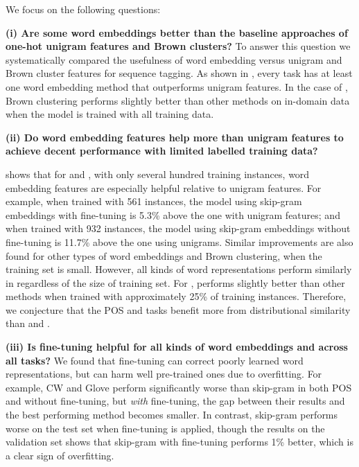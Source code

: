 We focus on the following questions:

\textbf{(i) Are some word embeddings better than the baseline approaches of one-hot unigram features and Brown clusters?}
To answer this question we systematically compared the usefulness of word embedding versus
unigram and Brown cluster features for sequence tagging.
As shown in , every task has at least one word embedding method that outperforms
unigram features. In the case of \chunking, Brown clustering performs slightly better than other methods on in-domain data when the model is trained with all training data. 


\textbf{(ii) Do word embedding features help more than unigram features to achieve decent performance with limited labelled training data?}

 shows that for \pos and \ner, with only several hundred training instances, 
word embedding features are especially helpful relative to unigram features. 
For example, when trained with 561 instances, the \pos model using skip-gram embeddings with fine-tuning is 5.3\% above
the one with unigram features; and when trained with 932 instances, the \ner model using skip-gram embeddings without fine-tuning is 11.7\% above the one using unigrams. 
Similar improvements are also found for other types of word embeddings and Brown clustering, when the training set is small. 
However, all kinds of word representations perform similarly in \chunking regardless of the size of training set. 
For \mwe, \Brown performs slightly better than other methods when trained with approximately 25\% of training instances. Therefore, we conjecture that the POS and \ner tasks benefit more from distributional similarity than \chunking and \mwe.

\textbf{(iii) Is fine-tuning helpful for all kinds of word embeddings and across all tasks?}
We found that fine-tuning can correct poorly learned word representations, but can harm well pre-trained ones due to overfitting. For example, CW and Glove perform significantly worse than skip-gram in both POS and \ner without fine-tuning, but \emph{with} fine-tuning, the gap between their results and the best performing method becomes smaller. In contrast, skip-gram performs worse on the test set when fine-tuning is applied, though the results on the validation set shows that skip-gram with fine-tuning performs 1\% better, which is a clear sign of overfitting.

